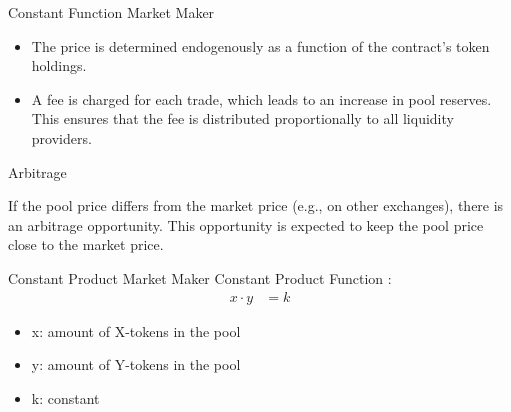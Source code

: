 \documentclass[]{beamer}
\begin{document}
\begin{frame}{Constant Function Market Maker}

	\begin{figure}	
		\centering
		
	\end{figure}

	\begin{itemize}
		\item<5-> The price is determined endogenously as a function of the contract's token holdings.
		\item<6-> A fee is charged for each trade, which leads to an increase in pool reserves. This ensures that the fee is distributed proportionally to all liquidity providers.
	\end{itemize}


\end{frame}


\begin{frame}{Arbitrage}
	\begin{figure}
		
	\end{figure}
		
		If the pool price differs from the market price (e.g., on other exchanges), there is an arbitrage opportunity. This opportunity is expected to keep the pool price close to the market price.
\end{frame}


\begin{frame}{Constant Product Market Maker}
Constant Product Function \cite{UNIV2}:
	\begin{align*}
		x \cdot y &= k
	\end{align*}

	\begin{itemize}
		\item[] x: amount of X-tokens in the pool
		\item[] y: amount of Y-tokens in the pool
		\item[] k: constant
	\end{itemize}
	\vspace{1cm}
\end{frame}
\end{document}
